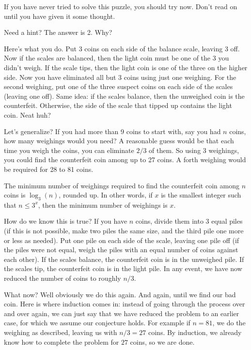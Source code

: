\documentclass[12pt]{article}
\begin{document}
If you have never tried to solve this puzzle, you should try now.  Don't read on until you have given it some thought.

Need a hint?  The answer is 2.  Why?

Here's what you do.  Put 3 coins on each side of the balance scale, leaving 3 off.  Now if the scales are balanced, then the light coin must be one of the 3 you didn't weigh.  If the scale tips, then the light coin is one of the three on the higher side.  Now you have eliminated all but 3 coins using just one weighing.  For the second weighing, put one of the three suspect coins on each side of the scales (leaving one off).  Same idea: if the scales balance, then the unweighed coin is the counterfeit.  Otherwise, the side of the scale that tipped up contains the light coin.  Neat huh?

Let's generalize?  If you had more than 9 coins to start with, say you had $n$ coins, how many weighings would you need?  A reasonable guess would be that each time you weigh the coins, you can eliminate $2/3$ of them.  So using 3 weighings, you could find the counterfeit coin among up to 27 coins.  A forth weighing would be required for 28 to 81 coins.  

\begin{conjecture}
	The minimum number of weighings required to find the counterfeit coin among $n$ coins is $\log_3(n)$, rounded up.  In other words, if $x$ is the smallest integer such that $n \le 3^x$, then the minimum number of weighings is $x$. 
\end{conjecture}

How do we know this is true?  If you have $n$ coins, divide them into 3 equal piles (if this is not possible, make two piles the same size, and the third pile one more or less as needed).  Put one pile on each side of the scale, leaving one pile off (if the piles were not equal, weigh the piles with an equal number of coins against each other).  If the scales balance, the counterfeit coin is in the unweighed pile.  If the scales tip, the counterfeit coin is in the light pile.  In any event, we have now reduced the number of coins to roughly $n/3$.  

What now?  Well obviously we do this again.  And again, until we find our bad coin.  Here is where induction comes in: instead of going through the process over and over again, we can just say that we have reduced the problem to an earlier case, for which we assume our conjecture holds.  For example if $n =81$, we do the weighing as described, leaving us with $n/3 = 27$ coins.  By induction, we already know how to complete the problem for $27$ coins, so we are done.
\end{document}
